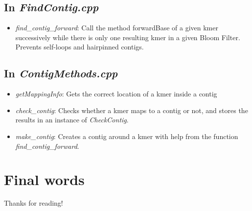 \documentclass[a4paper]{report}
\renewcommand{\i}[1]{\textit{#1}}  %
\begin{document}
\section{In \i{FindContig.cpp}}

\begin{itemize}
\item \i{find\_contig\_forward}: Call the method forwardBase of a given kmer successively while there is only one resulting kmer
in a given Bloom Filter. Prevents self-loops and hairpinned contigs.
\end{itemize}

\section{In \i{ContigMethods.cpp}}
\begin{itemize}
\item \i{getMappingInfo}: Gets the correct location of a kmer inside a contig
\item \i{check\_contig}: Checks whether a kmer maps to a contig or not, and stores the results in an instance of \i{CheckContig}.
\item \i{make\_contig}: Creates a contig around a kmer with help from the function \i{find\_contig\_forward}.
\end{itemize}



\chapter{Final words}

Thanks for reading!

\vfill

\printbibliography                                                                                                                                   
\end{document}
